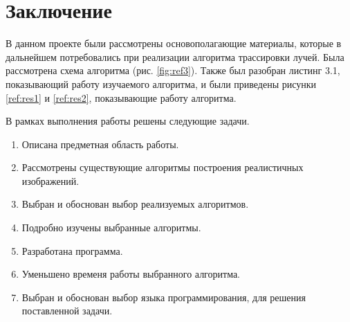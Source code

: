 \chapter*{Заключение}

В данном проекте были рассмотрены
основополагающие материалы, которые в дальнейшем потребовались
при реализации алгоритма трассировки лучей.
Была рассмотрена схема алгоритма (рис. \ref{fig:ref3}).
Также был разобран листинг 3.1,
показывающий работу изучаемого алгоритма,
и были приведены рисунки \ref{ref:res1} и \ref{ref:res2},
показывающие работу алгоритма.

В рамках выполнения работы решены следующие задачи.

\begin{enumerate}
	\item Описана предметная область работы.
	\item Рассмотрены существующие алгоритмы построения реалистичных изображений.
	\item Выбран и обоснован выбор реализуемых алгоритмов.
	\item Подробно изучены выбранные алгоритмы.
	\item Разработана программа.
	\item Уменьшено временя работы выбранного алгоритма.
	\item Выбран и обоснован выбор языка программирования, для решения поставленной задачи.
\end{enumerate}